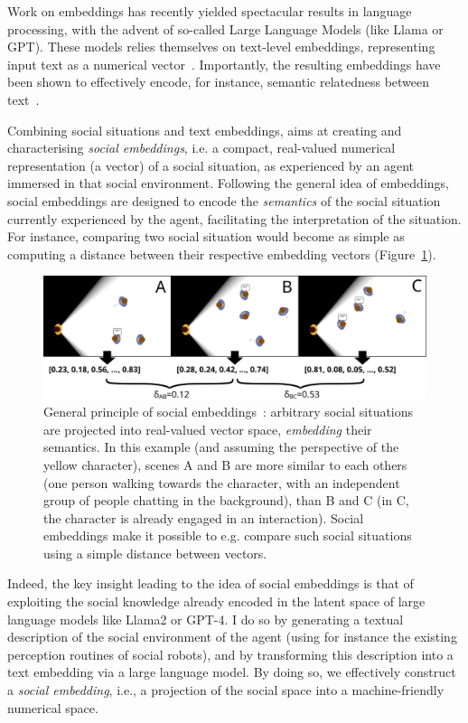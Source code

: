 Work on embeddings has recently yielded spectacular results in language
processing, with the advent of so-called Large Language Models (like Llama or
GPT). These models relies themselves on text-level embeddings, representing
input text as a numerical
vector~\cite{reimers2019sentencebert,muennighoff2022sgpt}. Importantly, the
resulting embeddings have been shown to effectively encode, for instance,
semantic relatedness between text~\cite{thakur2021beir}.

Combining social situations and text embeddings, \project aims at creating and
characterising \emph{social embeddings}, i.e. a compact, real-valued numerical
representation (a vector) of a social situation, as experienced by an agent
immersed in that social environment.  Following the general idea of embeddings,
social embeddings are designed to encode the \emph{semantics} of the social
situation currently experienced by the agent, facilitating the interpretation of
the situation. For instance, comparing two social situation would become as
simple as computing a distance between their respective embedding vectors
(Figure~\ref{fig:social-embeddings}).


\begin{figure}[H]
    \centering
    \includegraphics[width=0.9\linewidth]{figs/social-embeddings}
    \caption{General principle of social embeddings~\cite{lemaignan2024social}: arbitrary social situations
    are projected into real-valued vector space, \emph{embedding} their
    semantics. In this example (and assuming the perspective of the yellow
    character), scenes A and B  are more similar to each others (one person
    walking towards the character, with an independent group of people chatting
    in the background), than B and C (in C, the character is already engaged in
    an interaction).  Social embeddings make it possible to e.g. compare such
    social situations using a simple distance between vectors.}

    \label{fig:social-embeddings}
\end{figure}

Indeed, the key insight leading to the idea of social embeddings is that of exploiting
the social knowledge already encoded in the latent space of large language
models like Llama2 or GPT-4. I do so by generating a textual
description of the social environment of the agent (using for instance the
existing perception routines of social robots), and by transforming this
description into a text embedding via a large language model.  By doing so, we
effectively construct a \emph{social embedding}, i.e., a projection of the
social space into a machine-friendly numerical space. 

